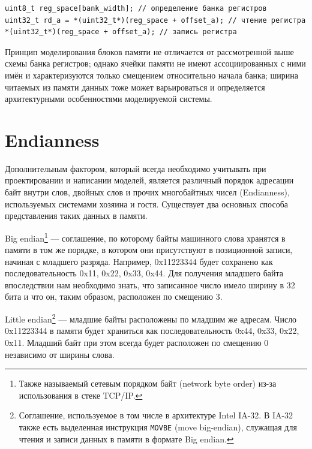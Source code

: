 \begin{lstlisting}
uint8_t reg_space[bank_width]; // определение банка регистров
uint32_t rd_a = *(uint32_t*)(reg_space + offset_a); // чтение регистра
*(uint32_t*)(reg_space + offset_a); // запись регистра  
\end{lstlisting}

Принцип моделирования блоков памяти не отличается от рассмотренной выше схемы банка регистров; однако ячейки памяти не имеют ассоциированных с ними имён и характеризуются только смещением относительно начала банка; ширина читаемых из памяти данных тоже может варьироваться и определяется архитектурными особенностями моделируемой системы.

\section{Endianness}


Дополнительным фактором, который всегда необходимо учитывать при проектировании и написании моделей, является различный порядок адресации байт внутри слов, двойных слов и прочих многобайтных чисел (\abbr Endianness), используемых системами хозяина и гостя. Существует два основных способа представления таких данных в памяти.

\begin{enumerate*}
\item Big endian\footnote{Также называемый сетевым порядком байт (\abbr network byte order) из-за использования в стеке TCP/IP.} — соглашение, по которому байты машинного слова хранятся в памяти в том же порядке, в котором они присутствуют в позиционной записи, начиная с младшего разряда. Например, 0x11223344 будет сохранено как последовательность 0x11, 0x22, 0x33, 0x44. Для получения младшего байта впоследствии нам необходимо знать, что записанное число имело ширину в 32 бита и что он, таким образом, расположен по смещению 3.

\item Little endian\footnote{Соглашение, используемое в том числе в архитектуре Intel IA-32. В IA-32 также есть выделенная инструкция \texttt{MOVBE} (\abbr move big-endian), служащая для чтения и записи данных в памяти в формате Big endian.} — младшие байты расположены по младшим же адресам. Число 0x11223344 в памяти будет храниться как последовательность 0x44, 0x33, 0x22, 0x11. Младший байт при этом всегда будет расположен по смещению 0 независимо от ширины слова.
\end{enumerate*}

